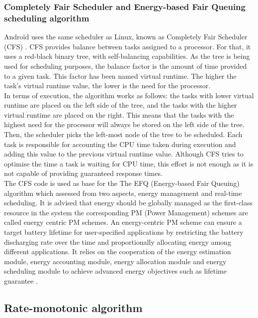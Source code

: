 \documentclass[conference]{IEEEtran}
\begin{document}
\subsubsection{Completely Fair Scheduler and Energy-based Fair Queuing scheduling algorithm}

Android uses the same scheduler as Linux, known as Completely Fair Scheduler (CFS) \cite{ANDR01}. CFS provides balance between tasks assigned to a processor. For that, it uses a red-black binary tree,  with self-balancing capabilities.  As the tree is being used for scheduling purposes, the balance factor is the amount of time provided to a given task. This factor has been named virtual runtime. The higher the task’s virtual runtime value, the lower is the need for the processor.\\
In terms of execution, the algorithm works as follows: the tasks with lower virtual runtime are placed on the left side of the tree, and the tasks with the higher virtual runtime are placed on the right. This means that the tasks with the highest need for the processor will always be  stored on the left side of the tree. Then, the scheduler picks the left-most node of the tree to be scheduled. Each task is responsible for accounting the CPU time taken during execution and adding this value to the previous virtual runtime value. Although CFS tries to optimise the time a task is waiting for CPU time, this effort is not enough as it is not capable of providing guaranteed response times. \\
The CFS code is used as base for the The EFQ (Energy-based Fair Queuing) algorithm which assessed from two aspects, energy management and real-time scheduling. 
It is advised that energy should be globally managed as the first-class resource in the system  the corresponding PM (Power Management) schemes are called energy centric PM schemes. An energy-centric PM scheme can ensure a target battery lifetime for user-specified applications by restricting the battery discharging rate over the time and proportionally allocating energy among different applications.  It relies on the cooperation of the energy estimation module, energy accounting module, energy allocation module and energy scheduling module to achieve advanced energy objectives such as lifetime guarantee \cite{WEI01}.

\subsection{Rate-monotonic algorithm}
\end{document}

